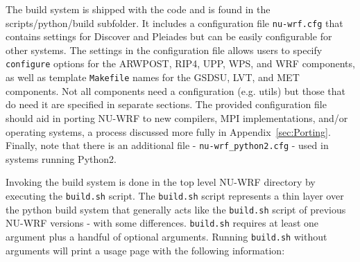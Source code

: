 The build system is shipped with the code and is found in the scripts/python/build subfolder. 
It includes a configuration file \texttt{nu-wrf.cfg} that contains settings for Discover and Pleiades but can be easily configurable for other systems. The settings in the configuration file allows users to specify 
\texttt{configure} options for the ARWPOST, RIP4, UPP, WPS, and WRF components, as well as template \texttt{Makefile} names for the  GSDSU, LVT, and MET components. Not all components 
need a configuration (e.g. utils) but those that do need it are specified in separate sections. 
The provided configuration file should aid in porting NU-WRF to new 
compilers, MPI implementations, and/or operating systems, a process discussed 
more fully in Appendix~\ref{sec:Porting}. Finally, note that there is an additional file - \texttt{nu-wrf\_python2.cfg} - used in systems running Python2.

Invoking the build system is done in the top level NU-WRF directory by executing the \texttt{build.sh} script.
The \texttt{build.sh} script represents a thin layer over the python build system that generally acts like the \texttt{build.sh} script of previous NU-WRF versions - with some differences. \texttt{build.sh} requires at least one argument plus a handful of optional arguments. Running \texttt{build.sh} without arguments will print a usage page with the following information:

